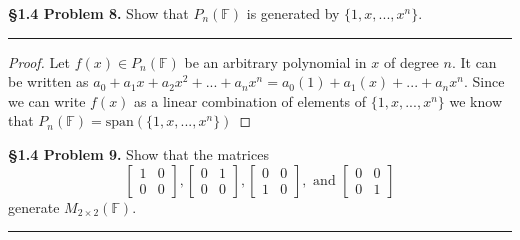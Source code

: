 \documentclass[leqno]{article}
\theoremstyle{nonumberplain}
\newtheorem{proof}{Proof}
\begin{document}


\noindent\textbf{\S 1.4 Problem 8.} Show that $P_n(\mathbb{F})$ is generated by $\{1,x,...,x^n\}$.

\noindent\rule[0.5ex]{\linewidth}{1pt}

\begin{proof}
Let $f(x)\in P_n(\mathbb{F})$ be an arbitrary polynomial in $x$ of degree $n$.  It can be written as $a_0+a_1x+a_2x^2+...+a_nx^n=a_0(1)+a_1(x)+...+a_nx^n$.  Since we can write $f(x)$ as a linear combination of elements of $\{1,x,...,x^n\}$ we know that $P_n(\mathbb{F})=\textrm{span}(\{1,x,...,x^n\})$
\end{proof}
\pagebreak




\noindent\textbf{\S 1.4 Problem 9.} Show that the matrices
\[
\begin{bmatrix}
	1 & 0 \\
	0 & 0 
\end{bmatrix},
\begin{bmatrix}
	0 & 1 \\
	0 & 0 
\end{bmatrix},
\begin{bmatrix}
	0 & 0 \\
	1 & 0 
\end{bmatrix}, \textrm{ and }
\begin{bmatrix}
	0 & 0 \\
	0 & 1 
\end{bmatrix}
\]
generate $M_{2\times 2}(\mathbb{F})$.


\noindent\rule[0.5ex]{\linewidth}{1pt}
\end{document}
